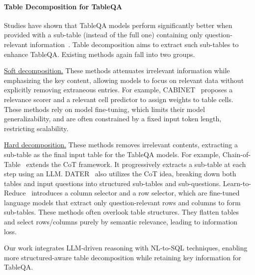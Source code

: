 \paragraph{Table Decomposition for TableQA} Studies have shown that TableQA models perform significantly better when provided with a sub-table (instead of the full one) containing only question-relevant information~\cite{ye2023large, lee2024learning, patnaik2024cabinet}. Table decomposition aims to extract such sub-tables to enhance TableQA. Existing  methods again fall into two groups.

\underline{Soft decomposition.} These methods attenuates irrelevant information while emphasizing the key content, allowing models to focus on relevant data without explicitly removing extraneous entries. For example, CABINET~\cite{patnaik2024cabinet} proposes a relevance scorer and a relevant cell predictor to assign weights to table cells. %
These methods rely on model fine-tuning, which limits their model generalizability, and are often constrained by a fixed input token length, restricting scalability.

\underline{Hard decomposition.} These methods removes irrelevant contents, extracting a sub-table as the final input table for the TableQA models. For example, Chain-of-Table~\cite{wang2024chainoftable} extends the CoT framework. It progressively extracts a sub-table at each step using an LLM. DATER~\cite{ye2023large} also utilizes the CoT idea, breaking down both tables and input questions into structured sub-tables and sub-questions. Learn-to-Reduce~\cite{lee2024learning} introduces a column selector and a row selector, which are fine-tuned language models that extract only question-relevant rows and columns to form sub-tables. 
These methods often overlook table structures. They flatten tables and select rows/columns purely by semantic relevance, leading to information loss. 

Our work integrates LLM-driven reasoning with NL-to-SQL techniques, enabling more structured-aware table decomposition while retaining key information for TableQA.